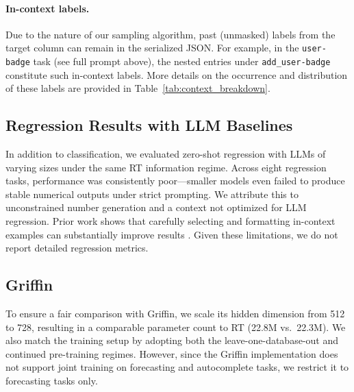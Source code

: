 \paragraph{In-context labels.}
Due to the nature of our sampling algorithm, past (unmasked) labels from the target column can remain in the serialized JSON. For example, in the \texttt{user-badge} task (see full prompt above), the nested entries under \texttt{add\_user-badge} constitute such in-context labels. More details on the occurrence and distribution of these labels are provided in Table~\ref{tab:context_breakdown}.





\subsection{Regression Results with LLM Baselines}
\label{app:llm_poor_regression}
In addition to classification, we evaluated zero-shot regression with LLMs of varying sizes under the same RT information regime. Across eight regression tasks, performance was consistently poor—smaller models even failed to produce stable numerical outputs  under strict prompting. We attribute this to unconstrained number generation and a context not optimized for LLM regression. Prior work shows that carefully selecting and formatting in-context examples can substantially improve results \citep{nafar2025learning}. Given these limitations, we do not report detailed regression metrics.

\subsection{Griffin}
To ensure a fair comparison with Griffin, we scale its hidden dimension from 512 to 728, resulting in a comparable parameter count to RT (22.8M vs.\ 22.3M). We also match the training setup by adopting both the leave-one-database-out and continued pre-training regimes. However, since the Griffin implementation does not support joint training on forecasting and autocomplete tasks, we restrict it to forecasting tasks only.

